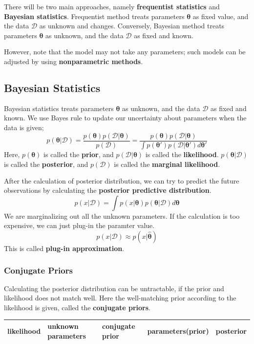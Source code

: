 \documentclass{article}
\newcommand{\param}{\boldsymbol{\theta}}
\newcommand{\data}{\mathcal D}
\begin{document}
There will be two main approaches, namely \textbf{frequentist statistics} and \textbf{Bayesian statistics}.
Frequentist method treats parameters $\boldsymbol{\theta}$ as fixed value, and the data  $\mathcal D$ as unknown and changes.
Conversely, Bayesian method treats parameters $\boldsymbol{\theta}$ as unknown, and the data  $\mathcal D$ as fixed and known.


However, note that the model may not take any parameters; such models can be adjusted by using \textbf{nonparametric methods}.

\subsection{Bayesian Statistics}
Bayesian statistics treats parameters $\boldsymbol{\theta}$ as unknown, and the data $\mathcal D$ as fixed and known.
We use Bayes rule to update our uncertainty about parameters when the data is given;
\[
p(\boldsymbol{\theta}|\mathcal D) =
\dfrac
{p(\boldsymbol{\theta}) p(\mathcal D|\boldsymbol{\theta})}
{p(\mathcal D)} =
\dfrac
{p(\boldsymbol{\theta}) p(\mathcal D|\boldsymbol{\theta})}
{\int p(\boldsymbol{\theta}') p(\mathcal D|\boldsymbol{\theta}') d\boldsymbol{\theta}'}
\]
Here, $p(\param)$ is called the \textbf{prior}, and $p(\data|\param)$ is called the \textbf{likelihood}.
$p(\param|\data)$ is called the \textbf{posterior}, and $p(\data)$ is called the \textbf{marginal likelihood}.


After the calculation of posterior distribution, we can try to predict the future observations by calculating the \textbf{posterior predictive distribution}.
\[
p(x|\data) = \int p(x|\param)p(\param|\data)d\param
\]
We are marginalizing out all the unknown parameters.
If the calculation is too expensive, we can just plug-in the paramter value.
\[
p(x|\data) \approx p(x|\hat{\param})
\]
This is called \textbf{plug-in approximation}.

\subsubsection{Conjugate Priors}
Calculating the posterior distribution can be untractable, if the prior and likelihood does not match well.
Here the well-matching prior according to the likelihood is given, called the \textbf{conjugate priors}.

\begin{center}
\begin{tabularx}{\textwidth}{XXXXX}
    \toprule
    \textbf{likelihood} &
    \textbf{unknown parameters} &
    \textbf{conjugate prior} &
    \textbf{parameters(prior)} &
    \textbf{posterior}
    \\
    \midrule
    
    \bottomrule
\end{tabularx}
\end{center}
\end{document}

